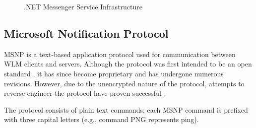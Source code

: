 \documentclass{sig-alternate}
\begin{document}
\begin{figure}[h]
	\centering
	\caption{.NET Messenger Service Infrastructure}
	\label{fig:wlminfrastructure}
\end{figure}

\subsection{Microsoft Notification Protocol}

MSNP is a text-based application protocol used for communication between WLM clients and servers.
Although the protocol was first intended to be an open standard \cite{fout:insidewlm}, it has since become proprietary and has undergone numerous revisions.
However, due to the unencrypted nature of the protocol, attempts to reverse-engineer the protocol have proven successful \cite{hypothetic:msnp, msnfanatic:msnp}.

The protocol consists of plain text commands; each MSNP command is prefixed with three capital letters (e.g., command PNG represents ping).
\end{document}
